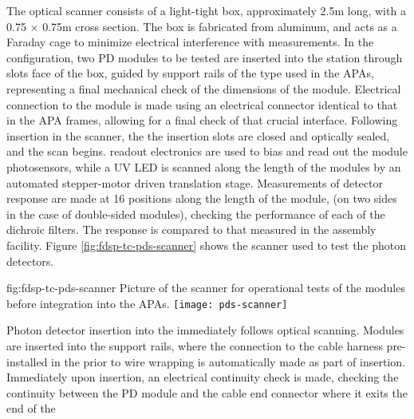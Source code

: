 The optical scanner consists of a light-tight box, approximately \num{2.5}m long, with a \num{0.75} $\times$ \num{0.75}m cross section. 
The box is fabricated from aluminum, and acts as a Faraday cage to minimize electrical interference with measurements. 
In the  configuration, two PD modules to be tested are inserted into the station through slots face of the box, guided by support rails of the type used in the APAs, representing a final mechanical check of the dimensions of the module.  
Electrical connection to the module is made using an electrical connector identical to that in the APA frames, allowing for a final check of that crucial interface.
Following insertion in the scanner, the the insertion slots are closed and optically sealed, and the scan begins. 
  readout electronics are used to bias and read out the module photosensors, while a UV LED is scanned along the length of the modules by an automated stepper-motor driven translation stage.  
Measurements of detector response are made at 16 positions along the length of the module, (on two sides in the case of double-sided  modules), checking the performance of each of the dichroic filters. 
The response is compared to that measured in the assembly facility. 
Figure \ref{fig:fdsp-tc-pds-scanner} shows the scanner used to test the  photon detectors.


\begin{dunefigure}{fig:fdsp-tc-pds-scanner}
{Picture of the scanner for operational tests of the  modules before integration into the APAs.}
\texttt{[image: pds-scanner]}
\end{dunefigure}

Photon detector insertion into the  immediately follows optical scanning.  
Modules are inserted into the  support rails, where the connection to the cable harness pre-installed in the  prior to wire wrapping is automatically made as part of insertion.  
Immediately upon insertion, an electrical continuity check is made, checking the continuity between the PD module and the  cable end connector where it exits the end of the 



